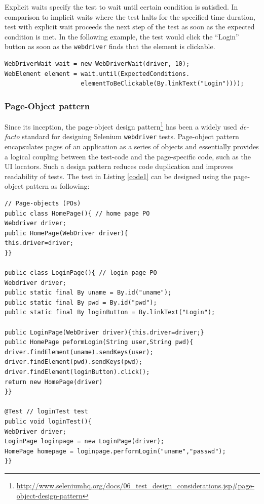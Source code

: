 Explicit waits specify the test to wait until certain condition is satisfied. In comparison to implicit waits where the test halts for the specified time duration, test with explicit wait proceeds the next step of the test as soon as the expected condition is met. In the following example, the test would click the ``Login'' button as soon as the \texttt{webdriver} finds that the element is clickable.
\begin{footnotesize}
\begin{verbatim}
WebDriverWait wait = new WebDriverWait(driver, 10);
WebElement element = wait.until(ExpectedConditions.
                     elementToBeClickable(By.linkText("Login"))));
\end{verbatim}
\end{footnotesize}

\subsubsection{Page-Object pattern}
\label{page-object}
Since its inception, the page-object design pattern\footnote{\url{http://www.seleniumhq.org/docs/06_test_design_considerations.jsp\#page-object-design-pattern}} has been a widely used \textit{de-facto} standard for designing Selenium \texttt{webdriver} tests. 
Page-object pattern encapsulates pages of an application as a series of objects and essentially provides a logical coupling between the test-code and the page-specific code, such as the UI locators. Such a design pattern reduces code duplication and improves readability of tests. The test in Listing \ref{code1} can be designed using the page-object pattern as following: 

\begin{center}
\begin{scriptsize}
\centering
\lstset{
  basicstyle=\ttfamily,
  columns=fullflexible,
  keepspaces=true,
}
  
\begin{lstlisting}[caption=Page-Objects design for \texttt{loginTest},label=code2]
// Page-objects (POs)
public class HomePage(){ // home page PO
Webdriver driver;
public HomePage(WebDriver driver){
this.driver=driver;
}}

public class LoginPage(){ // login page PO
Webdriver driver;
public static final By uname = By.id("uname");
public static final By pwd = By.id("pwd");
public static final By loginButton = By.linkText("Login");

public LoginPage(WebDriver driver){this.driver=driver;}
public HomePage peformLogin(String user,String pwd){
driver.findElement(uname).sendKeys(user);
driver.findElement(pwd).sendKeys(pwd);
driver.findElement(loginButton).click();
return new HomePage(driver)
}}

@Test // loginTest test
public void loginTest(){
WebDriver driver;
LoginPage loginpage = new LoginPage(driver);
HomePage homepage = loginpage.performLogin("uname","passwd");
}}
\end{lstlisting}
\end{scriptsize} 
\end{center}
 
